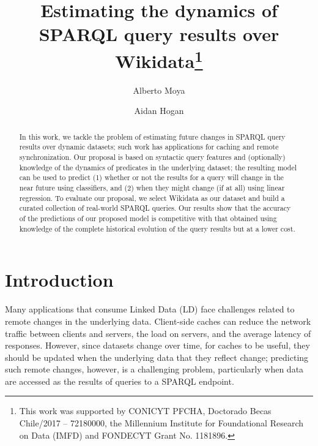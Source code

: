 \documentclass[runningheads]{llncs}
\begin{document}
%
\title{Estimating the dynamics of\\SPARQL query results over Wikidata\thanks{This work was supported by CONICYT PFCHA, Doctorado Becas Chile/2017 -- 72180000, the Millennium Institute for Foundational Research on Data (IMFD) and FONDECYT Grant No. 1181896.}}
%
%
\author{Alberto Moya \and
Aidan Hogan}
%
%
%
\maketitle              %
%
\begin{abstract}
In this work, we tackle the problem of estimating future changes in SPARQL query results over dynamic datasets; such work has applications for caching and remote synchronization. Our proposal is based on syntactic query features and (optionally) knowledge of the dynamics of predicates in the underlying dataset; the resulting model can be used to predict (1) whether or not the results for a query will change in the near future using classifiers, and (2) when they might change (if at all) using linear regression. To evaluate our proposal, we select Wikidata as our dataset and build a curated collection of real-world SPARQL queries. Our results show that the accuracy of the predictions of our proposed model is competitive with that obtained using knowledge of the complete historical evolution of the query results but at a lower cost.

\end{abstract}
%
%
\section{Introduction}
\label{sec:intro}
%
Many applications that consume Linked Data (LD) face challenges related to remote changes in the underlying data. Client-side caches can reduce the network traffic between clients and servers, the load on servers, and the average latency of responses. However, since datasets change over time, for caches to be useful, they should be updated when the underlying data that they reflect change; predicting such remote changes, however, is a challenging problem, particularly when data are accessed as the results of queries to a SPARQL endpoint.
\end{document}
